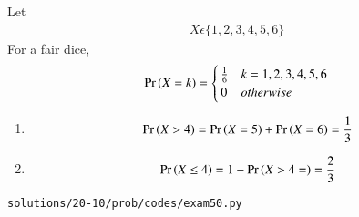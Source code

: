 Let
\begin{align}
X \epsilon \{1,2,3,4,5,6\}
\end{align}
For a fair dice,
\begin{align}
\Pr\left(X=k\right)=\begin{cases}
        \frac{1}{6}& k=1,2,3,4,5,6\\
        0 & otherwise
        \end{cases}
\end{align}
\begin{enumerate}
\item 
\begin{align}
\Pr\left(X > 4\right)=\Pr\left(X=5\right)+\Pr\left(X=6\right) = \frac{1}{3}
\end{align}
\item 
\begin{align}
\Pr\left(X \leq 4\right)=1-\Pr\left(X>4=\right)=\frac{2}{3}
\end{align}
\end{enumerate}
\begin{lstlisting}
solutions/20-10/prob/codes/exam50.py
\end{lstlisting}

